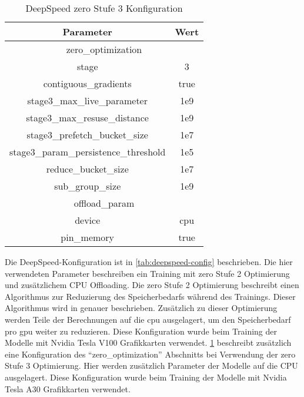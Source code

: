 \begin{table}
    \centering
    \begin{tabular}{cc}
        \toprule
        \textbf{Parameter}&\textbf{Wert}\\
        \midrule
        \multicolumn{2}{c}{zero\_optimization}\\
        stage&3\\
        contiguous\_gradients&true\\
        stage3\_max\_live\_parameter&1e9\\
        stage3\_max\_resuse\_distance&1e9\\
        stage3\_prefetch\_bucket\_size&1e7\\
        stage3\_param\_persistence\_threshold&1e5\\
        reduce\_bucket\_size&1e7\\
        sub\_group\_size&1e9\\
        \midrule
        \multicolumn{2}{c}{offload\_param}\\
        device&cpu\\
        pin\_memory&true\\
    \end{tabular}
    \caption{DeepSpeed \ac{zero} Stufe 3 Konfiguration}\label{tab:deepspeed-config-stage3}
\end{table}

Die DeepSpeed-Konfiguration ist in \cref{tab:deepspeed-config} beschrieben.
Die hier verwendeten Parameter beschreiben ein Training mit \ac{zero} Stufe 2 Optimierung und zusätzlichem CPU Offloading.
Die \ac{zero} Stufe 2 Optimierung beschreibt einen Algorithmus zur Reduzierung des Speicherbedarfs während des Trainings.
Dieser Algorithmus wird in \citet{deepspeed} genauer beschrieben.
Zusätzlich zu dieser Optimierung werden Teile der Berechnungen auf die \ac{cpu} ausgelagert, um den Speicherbedarf pro \ac{gpu} weiter zu reduzieren.
Diese Konfiguration wurde beim Training der Modelle mit Nvidia Tesla V100 Grafikkarten verwendet.
\cref{tab:deepspeed-config-stage3} beschreibt zusätzlich eine Konfiguration des \enquote{zero\_optimization} Abschnitts bei Verwendung der \ac{zero} Stufe 3 Optimierung.
Hier werden zusätzlich Parameter der Modelle auf die CPU ausgelagert. 
Diese Konfiguration wurde beim Training der Modelle mit Nvidia Tesla A30 Grafikkarten verwendet.\\\

